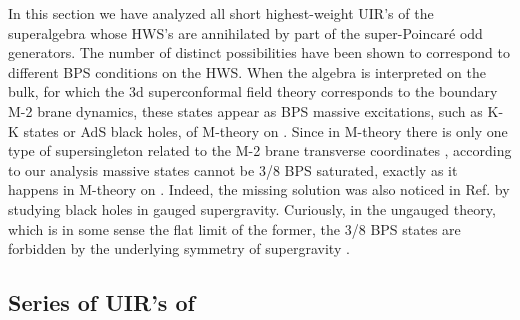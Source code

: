 \documentclass[a4paper,12pt]{article}
\begin{document}
In this section we have analyzed all short highest-weight UIR's  
of the \coordHE{} superalgebra whose HWS's are 
annihilated by part of the super-Poincar\'{e} odd generators. The 
number of distinct possibilities have been shown to correspond to 
different BPS conditions on the HWS. When the algebra is 
interpreted on the \coordHE{} bulk, for which the 3d superconformal 
field theory corresponds to the boundary M-2 brane dynamics, 
these states appear as BPS massive excitations, such as K-K 
states or AdS black holes, of M-theory on \coordHE{}. 
Since in M-theory there is only one type of supersingleton 
related to the M-2 brane transverse coordinates \cite{Duff1}, 
according to our analysis massive states cannot be 3/8 BPS 
saturated, exactly as it happens in M-theory on \coordHE{}. 
Indeed, the missing solution was also noticed in Ref. 
\cite{Duff2} by studying \coordHE{} black holes in gauged \coordHE{} 
supergravity. Curiously, in the ungauged theory, which is in some 
sense the flat limit of the former, the 3/8 BPS states are 
forbidden \cite{FMG} by the underlying \coordHE{} symmetry of 
\coordHE{} supergravity \cite{CJ}.    
 

\subsection{Series of UIR's of \coordHE{}}\label{short3}
\end{document}
